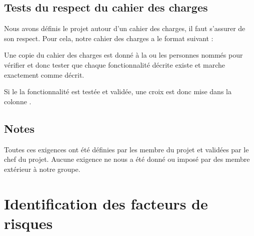 \documentclass[final]{article}
\newcommand{\code}[1]{
    \boxed{\texttt{#1}}
}
\begin{document}
    \subsection{Tests du respect du cahier des charges}
      Nous avons définis le projet autour d'un cahier des charges, il faut
      s'assurer de son respect. Pour cela, notre cahier des charges a le format suivant :
      
      \begin{figure}[H]
      \end{figure}
      
      Une copie du cahier des charges est donné à la ou les personnes nommés 
      pour vérifier et donc tester que chaque fonctionnalité décrite existe 
      et marche exactement comme décrit.
      
      Si le la fonctionnalité est testée et validée, une croix est donc mise 
      dans la colonne \code{T}.
      
    \subsection{Notes}
      Toutes ces exigences ont été définies par les membre du projet et validées 
      par le chef du projet. Aucune exigence ne nous a été donné ou imposé par
      des membre extérieur à notre groupe.
           
      
    \section{Identification des facteurs de risques}
\end{document}
